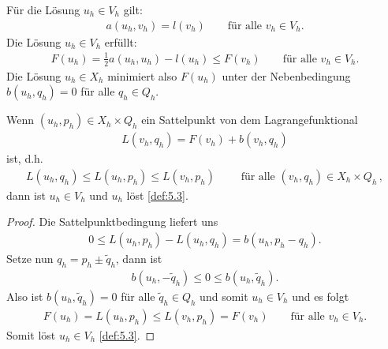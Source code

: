 Für die Lösung $u_h\in V_h$ gilt:
\begin{eqnarray*}
    a(u_h, v_h) = l(v_h)
    \qquad \text{für alle } v_h\in V_h.
\end{eqnarray*}
Die Lösung $u_h\in V_h$ erfüllt:
\begin{eqnarray*}
    F(u_h) = \frac{1}{2}a(u_h, u_h) - l(u_h) \le F(v_h)
    \qquad \text{für alle } v_h\in V_h.
\end{eqnarray*}
Die Lösung $u_h\in X_h$ minimiert also $F(u_h)$ unter der Nebenbedingung
$b(u_h, q_h) = 0$ für alle $q_h\in Q_h$.


\begin{Lemma}
    \label{lem:5.5}
    Wenn $(u_h,p_h)\in X_h \times Q_h$ ein Sattelpunkt von 
    dem Lagrangefunktional
    \begin{eqnarray*}
        L(v_h,q_h) = F(v_h) + b(v_h,q_h)
    \end{eqnarray*}
    ist, d.h.
    \begin{eqnarray*}
        L(u_h,q_h) \le L(u_h,p_h) \le L(v_h,p_h)
        \qquad
        \text{ für alle } (v_h,q_h) \in X_h \times Q_h \,,
    \end{eqnarray*}
    dann ist $u_h\in V_h$ und $u_h$ löst \eqref{def:5.3}.
\end{Lemma}


\begin{proof}
    Die Sattelpunktbedingung liefert uns
    \begin{eqnarray*}
        0 \le L(u_h, p_h) - L(u_h, q_h) = b(u_h, p_h - q_h).
    \end{eqnarray*}
    Setze nun $q_h = p_h \pm \tilde q_h$, dann ist
    \begin{eqnarray*}
        b(u_h, -\tilde q_h) \le 0 \le b(u_h, \tilde q_h).
    \end{eqnarray*}
    Also ist $b(u_h, \tilde q_h) = 0$ für alle $\tilde q_h\in Q_h$ und somit
    $u_h\in V_h$ und es folgt
    \begin{eqnarray*}
        F(u_h) = L(u_h, p_h) \le L(v_h, p_h) = F(v_h)
        \qquad \text{für alle } v_h\in V_h.
    \end{eqnarray*}
    Somit löst $u_h\in V_h$ \eqref{def:5.3}.
\end{proof}


